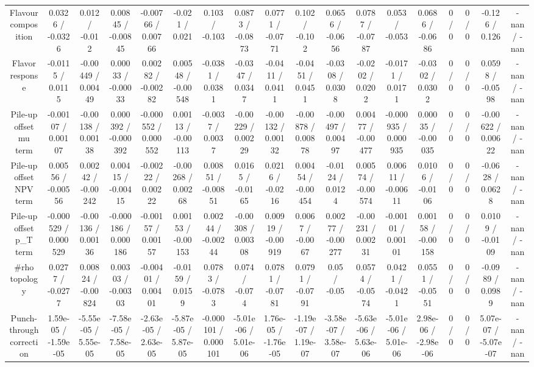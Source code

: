 \documentclass[10pt]{article}
\begin{document}
\begin{table}[htbp]
\begin{center}
\begin{tabular}{|c|c|c|c|c|c|c|c|c|c|c|c|c|c|c|c|c|c|}
  Flavour composition & 0.0326 / -0.0326 & 0.012 / -0.012 & 0.00845 / -0.00845 & -0.00766 / 0.00766 & -0.021 / 0.021 & 0.103 / -0.103 & 0.0873 / -0.0873 & 0.0771 / -0.0771 & 0.102 / -0.102 & 0.0656 / -0.0656 & 0.0787 / -0.0787 & 0.053 / -0.053 & 0.0686 / -0.0686 & 0 / 0 & 0 / 0 & -0.126 / 0.126 & -nan / -nan \\ 
  Flavor response & -0.0115 / 0.0115 & -0.00449 / 0.00449 & 0.00033 / -0.00033 & 0.00282 / -0.00282 & 0.00548 / -0.00548 & -0.0381 / 0.0381 & -0.0347 / 0.0347 & -0.0411 / 0.0411 & -0.0451 / 0.0451 & -0.0308 / 0.0308 & -0.0202 / 0.0202 & -0.0171 / 0.0171 & -0.0302 / 0.0302 & 0 / 0 & 0 / 0 & 0.0598 / -0.0598 & -nan / -nan \\ 
  Pile-up offset mu term & -0.00107 / 0.00107 & -0.00138 / 0.00138 & 0.000392 / -0.000392 & -0.000552 / 0.000552 & 0.00113 / -0.00113 & -0.0037 / 0.0037 & -0.00229 / 0.00229 & -0.00132 / 0.00132 & -0.00878 / 0.00878 & -0.00497 / 0.00497 & 0.00477 / -0.00477 & -0.000935 / 0.000935 & 0.00035 / -0.00035 & 0 / 0 & 0 / 0 & -0.00622 / 0.00622 & -nan / -nan \\ 
  Pile-up offset NPV term & 0.00556 / -0.00556 & 0.00242 / -0.00242 & 0.00415 / -0.00415 & -0.00222 / 0.00222 & -0.00268 / 0.00268 & 0.00851 / -0.00851 & 0.0165 / -0.0165 & 0.0216 / -0.0216 & 0.00454 / -0.00454 & -0.0124 / 0.0124 & 0.00574 / -0.00574 & 0.00611 / -0.00611 & 0.0106 / -0.0106 & 0 / 0 & 0 / 0 & -0.0628 / 0.0628 & -nan / -nan \\ 
  Pile-up offset p_{T} term & -0.000529 / 0.000529 & -0.00136 / 0.00136 & -0.000186 / 0.000186 & -0.00157 / 0.00157 & 0.00153 / -0.00153 & 0.00244 / -0.00244 & -0.00308 / 0.00308 & 0.00919 / -0.00919 & 0.0067 / -0.0067 & 0.00277 / -0.00277 & -0.00231 / 0.00231 & -0.00101 / 0.00101 & 0.00158 / -0.00158 & 0 / 0 & 0 / 0 & 0.0109 / -0.0109 & -nan / -nan \\ 
  #rho topology & 0.0277 / -0.0277 & 0.00824 / -0.00824 & 0.00303 / -0.00303 & -0.00401 / 0.00401 & -0.0159 / 0.0159 & 0.0783 / -0.0783 & 0.074 / -0.074 & 0.0781 / -0.0781 & 0.0791 / -0.0791 & 0.05 / -0.05 & 0.0574 / -0.0574 & 0.0421 / -0.0421 & 0.0551 / -0.0551 & 0 / 0 & 0 / 0 & -0.0989 / 0.0989 & -nan / -nan \\ 
  Punch-through correction & 1.59e-05 / -1.59e-05 & -5.55e-05 / 5.55e-05 & -7.58e-05 / 7.58e-05 & -2.63e-05 / 2.63e-05 & -5.87e-05 / 5.87e-05 & -0.000101 / 0.000101 & -5.01e-06 / 5.01e-06 & 1.76e-05 / -1.76e-05 & -1.19e-07 / 1.19e-07 & -3.58e-07 / 3.58e-07 & -5.63e-06 / 5.63e-06 & -5.01e-06 / 5.01e-06 & 2.98e-06 / -2.98e-06 & 0 / 0 & 0 / 0 & 5.07e-07 / -5.07e-07 & -nan / -nan \\ 

\end{tabular}
\end{center}
\end{table}
\end{document}
